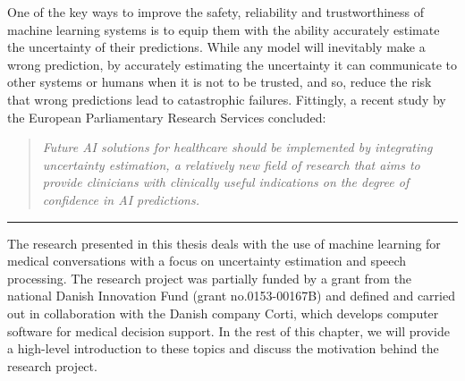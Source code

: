 One of the key ways to improve the safety, reliability and trustworthiness of machine learning systems is to equip them with the ability accurately estimate the uncertainty of their predictions. 
While any model will inevitably make a wrong prediction, by accurately estimating the uncertainty it can communicate to other systems or humans when it is not to be trusted, and so, reduce the risk that wrong predictions lead to catastrophic failures. 
Fittingly, a recent study by the European Parliamentary Research Services \parencite{europeanparliament_artificial_2022} concluded: 
%
\begin{quote}
    \centering\itshape
    Future AI solutions for healthcare should be implemented by integrating uncertainty estimation, a relatively new field of research that aims to provide clinicians with clinically useful indications on the degree of confidence in AI predictions.
\end{quote}
%
\vspace{0.5em}
\begin{center}
\noindent\rule{0.2\textwidth}{0.5pt}
\end{center}
\vspace{1em}

\noindent The research presented in this thesis deals with the use of machine learning for medical conversations with a focus on uncertainty estimation and speech processing. 
The research project was partially funded by a grant from the national Danish Innovation Fund (grant no.\@ 0153-00167B) and defined and carried out in collaboration with the Danish company Corti, which develops computer software for medical decision support. 
In the rest of this chapter, we will provide a high-level introduction to these topics and discuss the motivation behind the research project.



